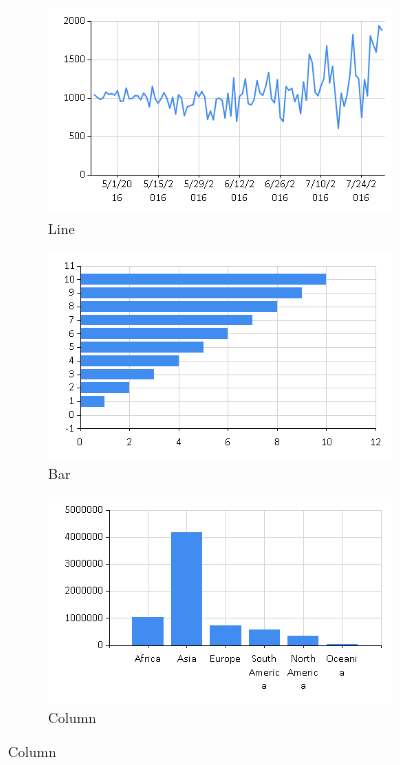 \begin{figure}[htb]
	\begin{subfigure}[b]{.30\linewidth}
		\centering
		\includegraphics[width=1\linewidth]{images/charting-line.png}
		\caption{Line}
	\end{subfigure}
	\begin{subfigure}[b]{.30\linewidth}
		\centering
		\includegraphics[width=1\linewidth]{images/charting-bar.png}
		\caption{Bar}
	\end{subfigure}
	\begin{subfigure}[b]{.30\linewidth}
		\centering
		\includegraphics[width=1\linewidth]{images/charting-column.png}
		\caption{Column}
	\end{subfigure}


\end{figure}
